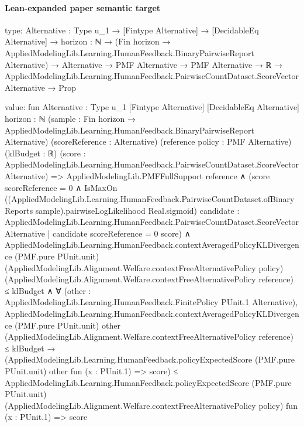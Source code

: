 \documentclass[10pt]{article}
\begin{document}
\paragraph{Lean-expanded paper semantic target}
\begin{ReviewVerbatim}
type:
{Alternative : Type u_1} →
  [Fintype Alternative] →
    [DecidableEq Alternative] →
      {horizon : ℕ} →
        (Fin horizon → AppliedModelingLib.Learning.HumanFeedback.BinaryPairwiseReport Alternative) →
          Alternative →
            PMF Alternative →
              PMF Alternative →
                ℝ → AppliedModelingLib.Learning.HumanFeedback.PairwiseCountDataset.ScoreVector Alternative → Prop

value:
fun {Alternative : Type u_1} [Fintype Alternative] [DecidableEq Alternative] {horizon : ℕ}
    (sample : Fin horizon → AppliedModelingLib.Learning.HumanFeedback.BinaryPairwiseReport Alternative)
    (scoreReference : Alternative) (reference policy : PMF Alternative) (klBudget : ℝ)
    (score : AppliedModelingLib.Learning.HumanFeedback.PairwiseCountDataset.ScoreVector Alternative) =>
  AppliedModelingLib.PMFFullSupport reference ∧
    (score scoreReference = 0 ∧
        IsMaxOn
          ((AppliedModelingLib.Learning.HumanFeedback.PairwiseCountDataset.ofBinaryReports sample).pairwiseLogLikelihood
            Real.sigmoid)
          {candidate : AppliedModelingLib.Learning.HumanFeedback.PairwiseCountDataset.ScoreVector Alternative |
            candidate scoreReference = 0}
          score) ∧
      AppliedModelingLib.Learning.HumanFeedback.contextAveragedPolicyKLDivergence (PMF.pure PUnit.unit)
            (AppliedModelingLib.Alignment.Welfare.contextFreeAlternativePolicy policy)
            (AppliedModelingLib.Alignment.Welfare.contextFreeAlternativePolicy reference) ≤
          klBudget ∧
        ∀ (other : AppliedModelingLib.Learning.HumanFeedback.FinitePolicy PUnit.{1} Alternative),
          AppliedModelingLib.Learning.HumanFeedback.contextAveragedPolicyKLDivergence (PMF.pure PUnit.unit) other
                (AppliedModelingLib.Alignment.Welfare.contextFreeAlternativePolicy reference) ≤
              klBudget →
            (AppliedModelingLib.Learning.HumanFeedback.policyExpectedScore (PMF.pure PUnit.unit) other
                fun (x : PUnit.{1}) => score) ≤
              AppliedModelingLib.Learning.HumanFeedback.policyExpectedScore (PMF.pure PUnit.unit)
                (AppliedModelingLib.Alignment.Welfare.contextFreeAlternativePolicy policy) fun (x : PUnit.{1}) => score
\end{ReviewVerbatim}
\end{document}
